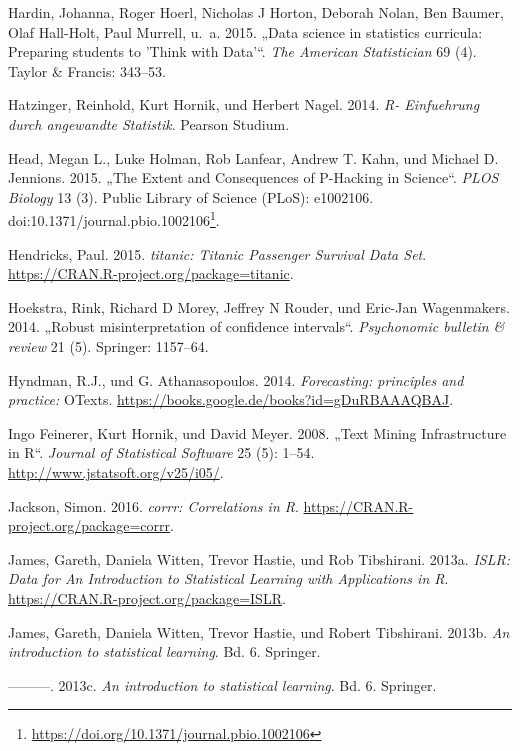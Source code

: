 \documentclass[12pt,ngerman,]{book}
\let\rmarkdownfootnote\footnote%
\def\footnote{\protect\rmarkdownfootnote}
\renewcommand{\href}[2]{#2\footnote{\url{#1}}}
\begin{document}
\hypertarget{ref-hardin2015data}{}
Hardin, Johanna, Roger Hoerl, Nicholas J Horton, Deborah Nolan, Ben
Baumer, Olaf Hall-Holt, Paul Murrell, u.~a. 2015. „Data science in
statistics curricula: Preparing students to 'Think with Data'``.
\emph{The American Statistician} 69 (4). Taylor \& Francis: 343--53.

\hypertarget{ref-Hatzinger}{}
Hatzinger, Reinhold, Kurt Hornik, und Herbert Nagel. 2014. \emph{R-
Einfuehrung durch angewandte Statistik}. Pearson Studium.

\hypertarget{ref-Head2015}{}
Head, Megan L., Luke Holman, Rob Lanfear, Andrew T. Kahn, und Michael D.
Jennions. 2015. „The Extent and Consequences of P-Hacking in Science``.
\emph{PLOS Biology} 13 (3). Public Library of Science (PLoS): e1002106.
doi:\href{https://doi.org/10.1371/journal.pbio.1002106}{10.1371/journal.pbio.1002106}.

\hypertarget{ref-R-titanic}{}
Hendricks, Paul. 2015. \emph{titanic: Titanic Passenger Survival Data
Set}. \url{https://CRAN.R-project.org/package=titanic}.

\hypertarget{ref-hoekstra2014robust}{}
Hoekstra, Rink, Richard D Morey, Jeffrey N Rouder, und Eric-Jan
Wagenmakers. 2014. „Robust misinterpretation of confidence intervals``.
\emph{Psychonomic bulletin \& review} 21 (5). Springer: 1157--64.

\hypertarget{ref-hyndman2014forecasting}{}
Hyndman, R.J., und G. Athanasopoulos. 2014. \emph{Forecasting:
principles and practice:} OTexts.
\url{https://books.google.de/books?id=gDuRBAAAQBAJ}.

\hypertarget{ref-tm}{}
Ingo Feinerer, Kurt Hornik, und David Meyer. 2008. „Text Mining
Infrastructure in R``. \emph{Journal of Statistical Software} 25 (5):
1--54. \url{http://www.jstatsoft.org/v25/i05/}.

\hypertarget{ref-R-corrr}{}
Jackson, Simon. 2016. \emph{corrr: Correlations in R}.
\url{https://CRAN.R-project.org/package=corrr}.

\hypertarget{ref-R-ISLR}{}
James, Gareth, Daniela Witten, Trevor Hastie, und Rob Tibshirani. 2013a.
\emph{ISLR: Data for An Introduction to Statistical Learning with
Applications in R}. \url{https://CRAN.R-project.org/package=ISLR}.

\hypertarget{ref-introstatlearning}{}
James, Gareth, Daniela Witten, Trevor Hastie, und Robert Tibshirani.
2013b. \emph{An introduction to statistical learning}. Bd. 6. Springer.

\hypertarget{ref-james2013introduction}{}
---------. 2013c. \emph{An introduction to statistical learning}. Bd. 6.
Springer.
\end{document}
